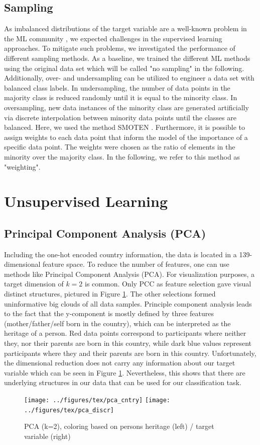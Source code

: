 \documentclass[10pt]{article}
\begin{document}
	\subsection{Sampling}\label{sec:sampling}
	As imbalanced distributions of the target variable are a well-known problem in the ML community \cite{chawla:2002, he:2008}, we expected challenges in the supervised learning approaches. To mitigate such problems, we investigated the performance of different sampling methods. As a baseline, we trained the different ML methods using the original data set which will be called "no sampling" in the following. Additionally, over- and undersampling can be utilized to engineer a data set with balanced class labels. In undersampling, the number of data points in the majority class is reduced randomly until it is equal to the minority class. In oversampling, new data instances of the minority class are generated artificially via discrete interpolation between minority data points until the classes are balanced. Here, we used the method SMOTEN \cite{chawla:2002}. 
	Furthermore, it is possible to assign weights to each data point that inform the model of the importance of a specific data point. The weights were chosen as the ratio of elements in the minority over the majority class. In the following, we refer to this method as "weighting".
	
	\section{Unsupervised Learning}
	\subsection{Principal Component Analysis (PCA)} %
	Including the one-hot encoded country information, the data is located in a 139-dimensional feature space. To reduce the number of features, one can use methods like Principal Component Analysis (PCA). For visualization purposes, a target dimension of $k=2$ is common.
	Only PCC as feature selection gave visual distinct structures, pictured in Figure \ref{fig:pca}. The other selections formed uninformative big clouds of all data samples.
	Principle component analysis leads to the fact that the y-component is mostly defined by three features (mother/father/self born in the country), which can be interpreted as the heritage of a person.
	Red data points correspond to participants where neither they, nor their parents are born in this country, while dark blue values represent participants where they and their parents are born in this country.
	Unfortunately, the dimensional reduction does not carry any information about our target variable which can be seen in Figure \ref{fig:pca}. Nevertheless, this shows that there are underlying structures in our data that can be used for our classification task.
	\begin{figure}
		\centering
		\texttt{[image: ../figures/tex/pca\_cntry]}
		\texttt{[image: ../figures/tex/pca\_discr]}
		\caption{PCA (k=2), coloring based on persons heritage (left) / target variable (right)}
		\label{fig:pca}
	\end{figure}
	
\end{document}
